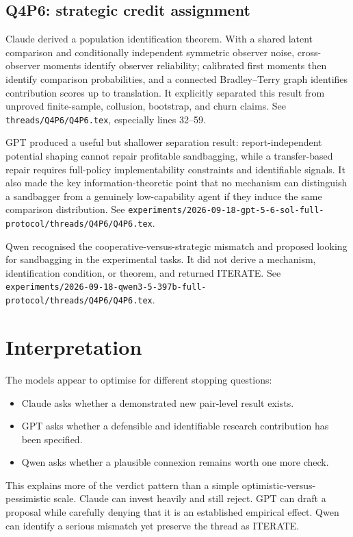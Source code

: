 \documentclass[11pt,a4paper]{article}
\newcommand{\file}[1]{\texttt{#1}}
\begin{document}
\subsection{Q4P6: strategic credit assignment}

Claude derived a population identification theorem.  With a shared latent
comparison and conditionally independent symmetric observer noise,
cross-observer moments identify observer reliability; calibrated first moments
then identify comparison probabilities, and a connected Bradley--Terry graph
identifies contribution scores up to translation.  It explicitly separated
this result from unproved finite-sample, collusion, bootstrap, and churn claims.
See \file{threads/Q4P6/Q4P6.tex}, especially lines 32--59.

GPT produced a useful but shallower separation result: report-independent
potential shaping cannot repair profitable sandbagging, while a transfer-based
repair requires full-policy implementability constraints and identifiable
signals.  It also made the key information-theoretic point that no mechanism
can distinguish a sandbagger from a genuinely low-capability agent if they
induce the same comparison distribution.  See
\file{experiments/2026-09-18-gpt-5-6-sol-full-protocol/threads/Q4P6/Q4P6.tex}.

Qwen recognised the cooperative-versus-strategic mismatch and proposed looking
for sandbagging in the experimental tasks.  It did not derive a mechanism,
identification condition, or theorem, and returned ITERATE.  See
\file{experiments/2026-09-18-qwen3-5-397b-full-protocol/threads/Q4P6/Q4P6.tex}.

\section{Interpretation}

The models appear to optimise for different stopping questions:
\begin{itemize}
  \item Claude asks whether a demonstrated new pair-level result exists.
  \item GPT asks whether a defensible and identifiable research contribution
        has been specified.
  \item Qwen asks whether a plausible connexion remains worth one more check.
\end{itemize}

This explains more of the verdict pattern than a simple optimistic-versus-
pessimistic scale.  Claude can invest heavily and still reject.  GPT can draft
a proposal while carefully denying that it is an established empirical effect.
Qwen can identify a serious mismatch yet preserve the thread as ITERATE.
\end{document}
